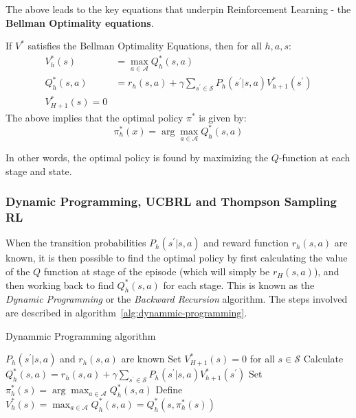 \documentclass{mldsmsc}
\begin{document}
The above leads to the key equations that underpin Reinforcement Learning - the \textbf{Bellman Optimality equations}.

\begin{proposition}\label{prop:bellman-optimality}
    If $V^*$ satisfies the Bellman Optimality Equations, then for all $h, a, s$:
    \begin{align*}
        V_h^*(s) &= \max_{a \in \mathcal{A}}Q_{h}^*(s,a)\\
        Q_h^*(s,a) &= r_h(s,a) + \gamma \sum_{s^\prime \in \mathcal{S}} P_h (s^\prime | s, a)V_{h+1}^*(s^\prime)\\
        V_{H+1}^*(s) = 0
    \end{align*}
    The above implies that the optimal policy $\pi^*$ is given by:
    \[
    \pi_h^*(x) = \arg\max_{a \in \mathcal{A}} Q_h^*(s,a)
    \]
\end{proposition}

In other words, the optimal policy is found by maximizing the $Q$-function at each stage and
state.

\subsubsection{Dynamic Programming, UCBRL and Thompson Sampling RL}

When the transition probabilities $P_h(s^\prime|s,a)$ and reward function
$r_h(s,a)$ are known, it is then possible to find the optimal policy by first calculating the
value of the $Q$ function at stage of the episode (which will simply be $r_H(s,a)$), and then working
back to find $Q_h^*(s,a)$ for each stage. This is known as the \emph{Dynamic Programming} or 
the \emph{Backward Recursion} algorithm. The steps involved are described in algorithm~\ref{alg:dynammic-programming}.

\begin{algorithm}
    \caption{Dynammic Programming algorithm}\label{alg:dynammic-programming}
    \begin{algorithmic}[1]
        \Require $P_h(s^\prime|s,a)$ and $r_h(s,a)$ are known
        \State Set $V_{H+1}^*(s) = 0$ for all $s \in \mathcal{S}$
            \State Calculate $Q_h^*(s,a) = r_h(s,a) + \gamma \sum_{s^\prime \in \mathcal{S}}P_h(s^\prime |s,a) V_{h+1}^*(s^\prime)$
            \State Set $\pi_h^*(s) = \arg\max_{a \in \mathcal{A}} Q_h^*(s,a)$
            \State Define $V_h^*(s) = \max_{a \in \mathcal{A}}Q_h^*(s,a) = Q_h^*(s, \pi_h^*(s))$
        \EndFor
    \end{algorithmic}
\end{algorithm}
\end{document}
